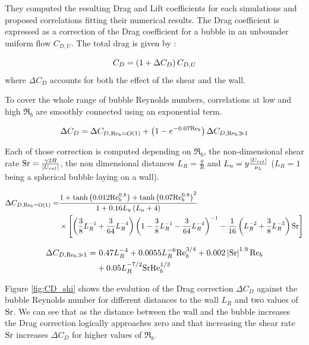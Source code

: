 They computed the resulting Drag and Lift coefficients for each simulations and proposed correlations fitting their numerical results. The Drag coefficient is expressed as a correction of the Drag coefficient for a bubble in an unbounder uniform flow  $C_{D,U}$. The total drag is given by :

\begin{equation}
C_{D}=\left( 1+\Delta C_{D} \right)C_{D,U}
\end{equation}
where $\Delta C_{D}$ accounts for both the effect of the shear and the wall. 

To cover the whole range of bubble Reynolds numbers, correlations at low and high $\Re_{b}$ are smoothly connected using an exponential term.

\begin{equation}
\Delta C_{D}=\Delta C_{D,\mathrm{Re}_{b}=O\left( 1 \right)}+\left( 1-e^{-0.07\mathrm{Re}_{b}} \right)\Delta C_{D,{\mathrm{Re}_{b}\gg 1}}
\end{equation}


Each of those correction is computed depending on $\Re_{b}$,  the non-dimensional shear rate $\mathrm{Sr} = \frac{\gamma 2R}{\left| U_{rel} \right|}$, the non dimensional distances $L_{R} = \frac{y}{R}$ and $L_{u}= y \frac{\left| U_{rel} \right|}{\nu_{L}}$  ($L_{R}=1$ being a spherical bubble laying on a wall). 


\begin{align}
\nonumber \Delta C_{D,\Re_{b}=O\parth{1}} = & \frac{1+\mathrm{tanh}\parth{0.012\Re_{b}^{0.8}} + \mathrm{tanh}\parth{0.07\Re_{b}^{0.8}}^{2}}{1+0.16L_{u}\parth{L_{u}+4}}
 \\
%
&\times \crocht{ \left(\frac{3}{8}L_{R}^{-1} + \frac{3}{64}L_{R}^{-4}\right) \left(1- \frac{3}{8}L_{R}^{-1}-\frac{3}{64}L_{R}^{-4}\right)^{-1}- \frac{1}{16}\left(L_{R}^{-2}+\frac{3}{8}L_{R}^{-3}\right)\text{Sr} }
\end{align}



\begin{align}
\nonumber \Delta C_{D,{\Re_{b}\gg 1}} =& ~0.47L_{R}^{-4}+0.0055L_{R}^{-6}\Re_{b}^{3/4} 
+0.002 \bars{\mathrm{Sr}}^{1.9} \Re_{b} \\
%
&+ 0.05 L_{R}^{-7/2} \mathrm{Sr} \Re_{b}^{1/3}
\end{align}


Figure \ref{fig:CD_shi} shows the evolution of the Drag correction $\Delta C_{D}$ against the bubble Reynolds number for different distances to the wall $L_{R}$ and two values of $\mathrm{Sr}$.  We can see that as the distance between the wall and the bubble increases the Drag correction logically approaches zero and that increasing the shear rate $\mathrm{Sr}$ increases $\Delta C_{D}$ for higher values of $\Re_{b}$.


